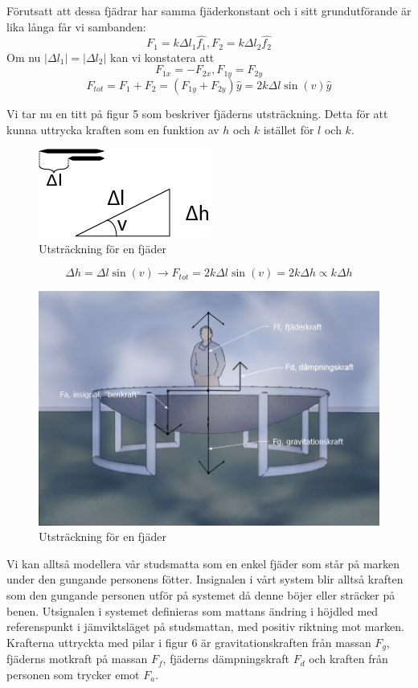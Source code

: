 \documentclass[10pt,a4paper]{article}
\begin{document}
Förutsatt att dessa fjädrar har samma fjäderkonstant och i sitt grundutförande är lika långa får vi sambanden:
$$F_1=k\Delta l_1\hat{f_1}, F_2=k\Delta l_2\hat{f_2}$$
Om nu $|\Delta l_1|=|\Delta l_2|$ kan vi konstatera att
$$F_{1x}=-F_{2x}, F_{1y}=F_{2y}$$
$$F_{tot}=F_1+F_2=(F_{1y}+F_{2y})\hat{y}=2k\Delta l\sin(v)\hat{y}$$

\pagebreak
Vi tar nu en titt på figur 5 som beskriver fjäderns utsträckning. Detta för att kunna uttrycka kraften som en funktion av $h$ och $k$ istället för $l$ och $k$.

\begin{figure}[ht]
\begin{center}
\includegraphics[scale=0.5]{utstrackning}
\caption{Utsträckning för en fjäder}
\end{center}
\end{figure}

$$\Delta h = \Delta l \sin(v) \rightarrow F_{tot}=2k\Delta l \sin(v)=2k\Delta h\propto k\Delta h $$

\begin{figure}[ht]
\begin{center}
\includegraphics[scale=0.5]{BildKrafterMedDampning}
\caption{Utsträckning för en fjäder}
\end{center}
\end{figure}

Vi kan alltså modellera vår studsmatta som en enkel fjäder som står på marken under den gungande personens fötter.
Insignalen i vårt system blir alltså kraften som den gungande personen utför på systemet då denne böjer eller sträcker på benen. Utsignalen i systemet definieras som mattans ändring i höjdled med referenspunkt i jämviktsläget på studsmattan, med positiv riktning mot marken. 
Krafterna uttryckta med pilar i figur 6 är gravitationskraften från massan $F_g$, fjäderns motkraft på massan $F_f$, fjäderns dämpningskraft $F_d$ och kraften från personen som trycker emot $F_a$.
\end{document}
